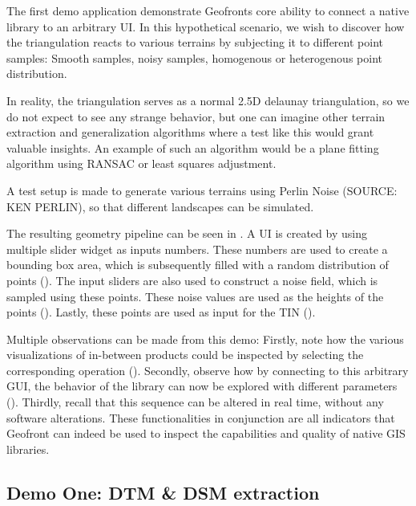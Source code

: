 The first demo application demonstrate Geofronts core ability to connect a native library to an arbitrary UI. 
In this hypothetical scenario, we wish to discover how the  triangulation reacts to various terrains by subjecting it to different point samples: Smooth samples, noisy samples, homogenous or heterogenous point distribution.

In reality, the  triangulation serves as a normal 2.5D delaunay triangulation, so we do not expect to see any strange behavior, but one can imagine other terrain extraction and generalization algorithms where a test like this would grant valuable insights.  
An example of such an algorithm would be a plane fitting algorithm using RANSAC or least squares adjustment.

A test setup is made to generate various terrains using Perlin Noise (SOURCE: KEN PERLIN), so that different landscapes can be simulated.

The resulting geometry pipeline can be seen in . 
A UI is created by using multiple slider widget as inputs numbers.
These numbers are used to create a bounding box area, which is subsequently filled with a random distribution of points ().
The input sliders are also used to construct a noise field, which is sampled using these points. These noise values are used as the heights of the points ().
Lastly, these points are used as input for the \ac{TIN} ().

Multiple observations can be made from this demo:
Firstly, note how the various visualizations of in-between products could be inspected by selecting the corresponding operation (). 
Secondly, observe how by connecting  to this arbitrary \ac{GUI}, the behavior of the library can now be explored with different parameters ().
Thirdly, recall that this sequence can be altered in real time, without any software alterations. 
These functionalities in conjunction are all indicators that Geofront can indeed be used to inspect the capabilities and quality of native \ac{GIS} libraries.

\subsection{Demo One: DTM \& DSM extraction}

